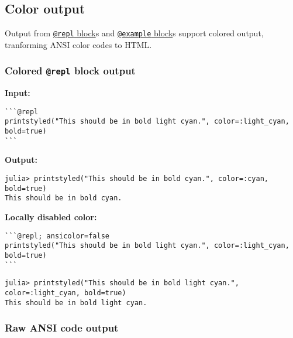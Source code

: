 \subsection{Color output}



\label{17347250707405175741}{}


Output from \href{@ref}{\texttt{@repl} block}s and \href{@ref}{\texttt{@example} block}s support colored output, tranforming ANSI color codes to HTML.



\subsubsection{Colored \texttt{@repl} block output}



\label{681009610151884915}{}


\textbf{Input:}




\begin{lstlisting}
```@repl
printstyled("This should be in bold light cyan.", color=:light_cyan, bold=true)
```
\end{lstlisting}



\textbf{Output:}




\begin{verbatim}
julia> printstyled("This should be in bold cyan.", color=:cyan, bold=true)
This should be in bold cyan.
\end{verbatim}



\textbf{Locally disabled color:}




\begin{lstlisting}
```@repl; ansicolor=false
printstyled("This should be in bold light cyan.", color=:light_cyan, bold=true)
```
\end{lstlisting}




\begin{verbatim}
julia> printstyled("This should be in bold light cyan.", color=:light_cyan, bold=true)
This should be in bold light cyan.
\end{verbatim}



\subsubsection{Raw ANSI code output}



